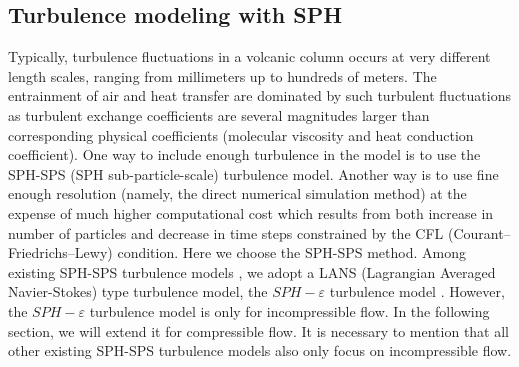 \documentclass[journal abbreviation, manuscript]{copernicus}
\begin{document}
\subsection{Turbulence modeling with SPH}
Typically, turbulence fluctuations in a volcanic column occurs at very different length scales, ranging from millimeters up to hundreds of meters. The entrainment of air and heat transfer are dominated by such turbulent fluctuations as turbulent exchange coefficients are several magnitudes larger than corresponding physical coefficients (molecular viscosity and heat conduction coefficient). One way to include enough turbulence in the model is to use the SPH-SPS (SPH sub-particle-scale) turbulence model. 
Another way is to use fine enough resolution (namely, the direct numerical simulation method) at the expense of much higher computational cost which results from both increase in number of particles and decrease in time steps constrained by the CFL (Courant–Friedrichs–Lewy) condition. Here we choose the SPH-SPS method. Among existing SPH-SPS turbulence models \citep{holm1999fluctuation, monaghan2002sph, violeau2007numerical, monaghan2011turbulence}, we adopt a LANS (Lagrangian Averaged Navier-Stokes) type turbulence model, the $SPH-\varepsilon$ turbulence model \citep{monaghan2011turbulence}. However, the $SPH-\varepsilon$ turbulence model is only for incompressible flow. In the following section, we will extend it for compressible flow. It is necessary to mention that all other existing SPH-SPS turbulence models \citep{holm1999fluctuation, monaghan2002sph, violeau2007numerical} also only focus on incompressible flow.

% 
\end{document}
